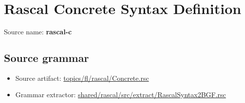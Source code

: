 \chapter{Rascal Concrete Syntax Definition}

 Source name: \textbf{rascal-c}

\section{Source grammar}

\begin{itemize}
\item Source artifact: \href{http://github.com/grammarware/slps/blob/master/topics/fl/rascal/Concrete.rsc}{topics/fl/rascal/Concrete.rsc}
\item Grammar extractor: \href{http://github.com/grammarware/slps/blob/master/shared/rascal/src/extract/RascalSyntax2BGF.rsc}{shared/rascal/src/extract/RascalSyntax2BGF.rsc}
\end{itemize}

